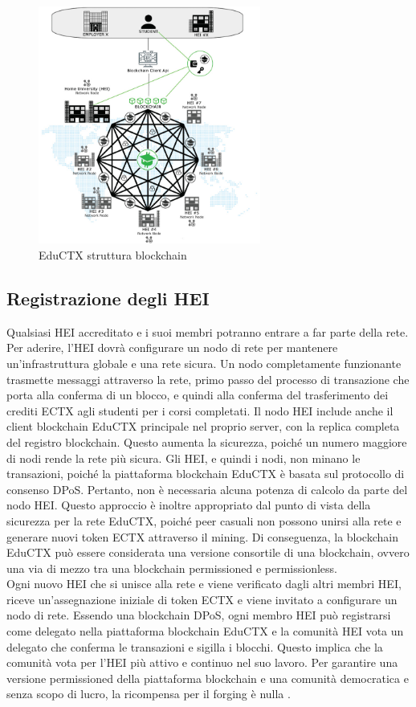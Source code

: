 \begin{figure}[h]
    \centering
    \includegraphics[width=0.65\textwidth]{Immagini/EduCTX_blockchain_structure.jpg}
    \caption{EduCTX struttura blockchain}
\end{figure}

\subsection{Registrazione degli HEI}
Qualsiasi HEI accreditato e i suoi membri potranno entrare a far parte della rete. 
Per aderire, l’HEI dovrà configurare un nodo di rete per mantenere un’infrastruttura globale e una rete sicura. 
Un nodo completamente funzionante trasmette messaggi attraverso la rete, primo passo del processo di transazione che porta alla conferma di un blocco, e quindi alla conferma del trasferimento dei crediti ECTX agli studenti per i corsi completati. 
Il nodo HEI include anche il client blockchain EduCTX principale nel proprio server, con la replica completa del registro blockchain. Questo aumenta la sicurezza, poiché un numero maggiore di nodi rende la rete più sicura.
Gli HEI, e quindi i nodi, non minano le transazioni, poiché la piattaforma blockchain EduCTX è basata sul protocollo di consenso DPoS. Pertanto, non è necessaria alcuna potenza di calcolo da parte del nodo HEI. 
Questo approccio è inoltre appropriato dal punto di vista della sicurezza per la rete EduCTX, poiché peer casuali non possono unirsi alla rete e generare nuovi token ECTX attraverso il mining. Di conseguenza, la blockchain EduCTX può essere considerata una versione consortile di una blockchain, ovvero una via di mezzo tra una blockchain permissioned e permissionless.
\\Ogni nuovo HEI che si unisce alla rete e viene verificato dagli altri membri HEI, riceve un’assegnazione iniziale di token ECTX e viene invitato a configurare un nodo di rete. Essendo una blockchain DPoS, ogni membro HEI può registrarsi come delegato nella piattaforma blockchain EduCTX e la comunità HEI vota un delegato che conferma le transazioni e sigilla i blocchi. 
Questo implica che la comunità vota per l’HEI più attivo e continuo nel suo lavoro. 
Per garantire una versione permissioned della piattaforma blockchain e una comunità democratica e senza scopo di lucro, la ricompensa per il forging è nulla \cite{EduCTX}.

